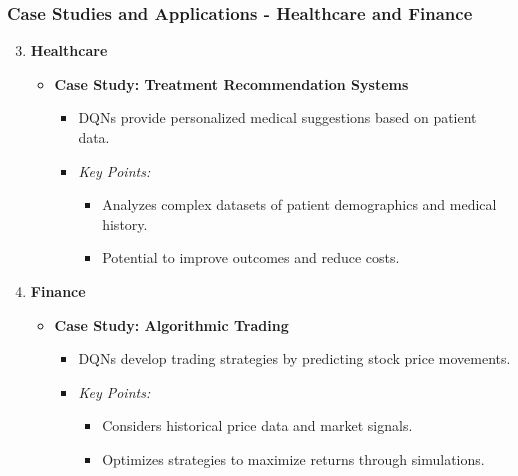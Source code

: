 \documentclass{beamer}
\begin{document}
\begin{frame}
    \frametitle{Case Studies and Applications - Healthcare and Finance}
    \begin{enumerate}
        \setcounter{enumi}{2}  %
        \item \textbf{Healthcare}
            \begin{itemize}
                \item \textbf{Case Study: Treatment Recommendation Systems}
                \begin{itemize}
                    \item DQNs provide personalized medical suggestions based on patient data.
                    \item \textit{Key Points:}
                    \begin{itemize}
                        \item Analyzes complex datasets of patient demographics and medical history.
                        \item Potential to improve outcomes and reduce costs.
                    \end{itemize}
                \end{itemize}
            \end{itemize}

        \item \textbf{Finance}
            \begin{itemize}
                \item \textbf{Case Study: Algorithmic Trading}
                \begin{itemize}
                    \item DQNs develop trading strategies by predicting stock price movements.
                    \item \textit{Key Points:}
                    \begin{itemize}
                        \item Considers historical price data and market signals.
                        \item Optimizes strategies to maximize returns through simulations.
                    \end{itemize}
                \end{itemize}
            \end{itemize}
    \end{enumerate}
\end{frame}
\end{document}
